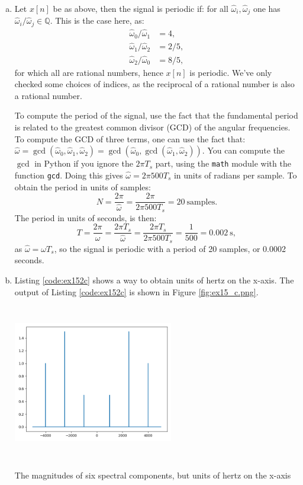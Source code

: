 \begin{enumerate}
\begin{enumerate}[a)]
\item Let $x[n]$ be as above, then the signal is periodic if: for all $\hat{\omega}_{i},\hat{\omega}_{j}$ one has $\hat{\omega}_{i}/\hat{\omega}_{j}\in\mathbb{Q}$. This is the case here, as:
\begin{align*}
    \hat{\omega}_{0}/\hat{\omega}_{1} &= 4,\\ 
    \hat{\omega}_{1}/\hat{\omega}_{2} &= 2/5,\\
    \hat{\omega}_{2}/\hat{\omega}_{0} &= 8/5,
\end{align*}
for which all are rational numbers, hence $x[n]$ is periodic. 
We've only checked some choices of indices, as the reciprocal of a rational number is also a rational number. 

To compute the period of the signal, use the fact that the fundamental period is related to the greatest common divisor (GCD) of the angular frequencies. To compute the GCD of three terms, one can use the fact that: $\hat{\omega}=\gcd(\hat{\omega}_{0},\hat{\omega}_{1},\hat{\omega}_{2})=\gcd(\hat{\omega}_{0},\gcd(\hat{\omega}_{1},\hat{\omega}_{2}))$. You can compute the $\gcd$ in Python if you ignore the $2\pi T_{s}$ part, using the \verb|math| module with the function \verb|gcd|. Doing this gives $\hat{\omega}=2\pi500T_{s}$ in units of radians per sample. To obtain the period in units of samples:
$$N=\frac{2\pi}{\hat{\omega}}=\frac{2\pi}{2\pi500T_{s}}=20 \ \text{samples}.$$
The period in units of seconds, is then:
$$T=\frac{2\pi}{\omega}=\frac{2\pi T_{s}}{\hat{\omega}}=\frac{2\pi T_{s}}{2\pi500T_{s}}=\frac{1}{500}=0.002 \ \text{s},$$
as $\hat{\omega}=\omega T_{s}$, so the signal is periodic with a period of 20 samples, or 0.0002 seconds. 

\item Listing \ref{code:ex152c} shows a way to obtain units of hertz on the x-axis. The output of Listing \ref{code:ex152c} is shown in Figure \ref{fig:ex15_c.png}. 


\begin{marginfigure}
    \includegraphics[width=7.0cm,height=6.8cm]{ch15/figures/ex15_c.png}
    \caption{The magnitudes of six spectral components, but units of hertz on the x-axis}
    \label{fig:ex15_c.png}
    \end{marginfigure}

\end{enumerate}

\end{enumerate}
